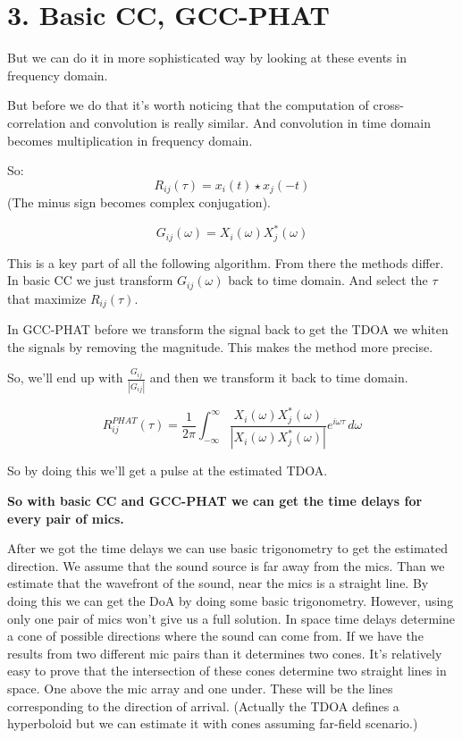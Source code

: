 \documentclass{article}
\begin{document}
\section*{3. Basic CC, GCC-PHAT}

But we can do it in more sophisticated way by looking at these events in frequency domain.

But before we do that it's worth noticing that the computation of cross-correlation and convolution is really similar. And convolution in time domain becomes multiplication in frequency domain.

So:
\begin{equation}
    R_{ij}(\tau) = x_i(t) \star x_j(-t)
\end{equation}
(The minus sign becomes complex conjugation).

\begin{equation}
    G_{ij}(\omega) = X_i(\omega) X_j^*(\omega)
\end{equation}

This is a key part of all the following algorithm. From there the methods differ. In basic CC we just transform $ G_{ij}(\omega) $ back to time domain. And select the $\tau$ that maximize $R_{ij}(\tau)$.

In GCC-PHAT before we transform the signal back to get the TDOA we whiten the signals by removing the magnitude. This makes the method more precise.

So, we'll end up with $\frac{G_{ij}}{|G_{ij}|}$ and then we transform it back to time domain.

\begin{equation}
    R_{ij}^{PHAT}(\tau) = \frac{1}{2\pi} \int_{-\infty}^{\infty} \frac{X_i(\omega) X_j^*(\omega)}{|X_i(\omega) X_j^*(\omega)|} e^{i\omega\tau} \, d\omega
\end{equation}

So by doing this we'll get a pulse at the estimated TDOA.

\vspace{1em}
\noindent \textbf{So with basic CC and GCC-PHAT we can get the time delays for every pair of mics.}

After we got the time delays we can use basic trigonometry to get the estimated direction. We assume that the sound source is far away from the mics. Than we estimate that the wavefront of the sound, near the mics is a straight line. By doing this we can get the DoA by doing some basic trigonometry. However, using only one pair of mics won't give us a full solution. In space time delays determine a cone of possible directions where the sound can come from. If we have the results from two different mic pairs than it determines two cones. It's relatively easy to prove that the intersection of these cones determine two straight lines in space. One above the mic array and one under. These will be the lines corresponding to the direction of arrival. (Actually the TDOA defines a hyperboloid but we can estimate it with cones assuming far-field scenario.)
\end{document}
